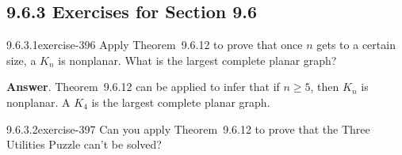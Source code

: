 \documentclass[twoside,10pt,]{book}
\numberwithin{equation}{section}
\begin{document}
\subsection*{9.6.3 Exercises for Section 9.6}
\begin{divisionsolution}{9.6.3.1}{}{exercise-396}%
\hypertarget{p-3478}{}%
Apply Theorem~9.6.12 to prove that once \(n\) gets to a certain size, a \(K_n\) is nonplanar. What is the largest complete planar graph?%
\par\smallskip%
\noindent\textbf{Answer}.\quad%
\hypertarget{p-3479}{}%
Theorem~9.6.12 can be applied to infer that if \(n\geqslant 5\), then \(K_n\) is nonplanar. A \(K_4\) is the largest complete planar graph.%
\end{divisionsolution}%
\begin{divisionsolution}{9.6.3.2}{}{exercise-397}%
\hypertarget{p-3480}{}%
Can you apply Theorem~9.6.12 to prove that the Three Utilities Puzzle can't be solved?%
\end{divisionsolution}%
\end{document}
